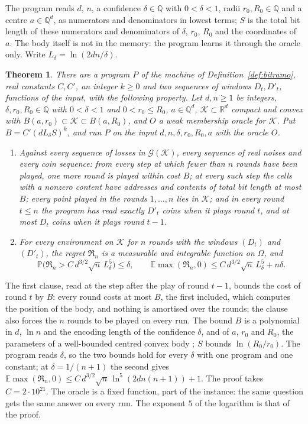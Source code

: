 \documentclass[11pt]{amsart}
\newtheorem{theorem}{Theorem}[section]
\theoremstyle{definition}
\numberwithin{equation}{section}
\newcommand{\R}{\mathbb{R}}
\newcommand{\E}{\mathbb{E}}
\newcommand{\Prob}{\mathbb{P}}
\newcommand{\cK}{\mathcal{K}}
\newcommand{\cG}{\mathscr{G}}
\newcommand{\Reg}{\mathfrak{R}}
\begin{document}
The program reads $d$, $n$, a confidence $\delta\in\mathbb Q$ with $0<\delta<1$, radii $r_0,R_0\in\mathbb Q$ and a centre $a\in\mathbb Q^d$, as numerators and denominators in lowest terms; $S$ is the total bit length of these numerators and denominators of $\delta$, $r_0$, $R_0$ and the coordinates of $a$. The body itself is not in the memory: the program learns it through the oracle only. Write $L_\delta=\ln(2dn/\delta)$.

\begin{theorem}\label{thm:unified}
There are a program $P$ of the machine of Definition~\ref{def:bitramo}, real constants $C,C'$, an integer $k\ge0$ and two sequences of windows $D_t,D'_t$, functions of the input, with the following property. Let $d,n\ge1$ be integers, $\delta,r_0,R_0\in\mathbb Q$ with $0<\delta<1$ and $0<r_0\le R_0$, $a\in\mathbb Q^d$, $\cK\subset\R^d$ compact and convex with $B(a,r_0)\subset\cK\subset B(a,R_0)$, and $O$ a weak membership oracle for $\cK$. Put $B=C'(dL_\delta S)^k$, and run $P$ on the input $d,n,\delta,r_0,R_0,a$ with the oracle $O$.
\begin{enumerate}[label=(\roman*)]
\item Against every sequence of losses in $\cG(\cK)$, every sequence of real noises and every coin sequence: from every step at which fewer than $n$ rounds have been played, one more round is played within cost $B$; at every such step the cells with a nonzero content have addresses and contents of total bit length at most $B$; every point played in the rounds $1,\dots,n$ lies in $\cK$; and in every round $t\le n$ the program has read exactly $D'_t$ coins when it plays round $t$, and at most $D_t$ coins when it plays round $t-1$.
\item For every environment on $\cK$ for $n$ rounds with the windows $(D_t)$ and $(D'_t)$, the regret $\Reg_n$ is a measurable and integrable function on $\Omega$, and
\[
\Prob\bigl(\Reg_n>C\,d^{3/2}\sqrt n\,L_\delta^5\bigr)\le\delta,\qquad\E\max(\Reg_n,0)\le C\,d^{3/2}\sqrt n\,L_\delta^5+n\delta .
\]
\end{enumerate}
\end{theorem}

The first clause, read at the step after the play of round $t-1$, bounds the cost of round $t$ by $B$: every round costs at most $B$, the first included, which computes the position of the body, and nothing is amortised over the rounds; the clause also forces the $n$ rounds to be played on every run. The bound $B$ is a polynomial in $d$, $\ln n$ and the encoding length of the confidence $\delta$, and of $a$, $r_0$ and $R_0$, the parameters of a well-bounded centred convex body \cite[(2.1.16) and (2.1.20)(c)]{GLS93}; $S$ bounds $\ln(R_0/r_0)$. The program reads $\delta$, so the two bounds hold for every $\delta$ with one program and one constant; at $\delta=1/(n+1)$ the second gives $\E\max(\Reg_n,0)\le C\,d^{3/2}\sqrt n\,\ln^5(2dn(n+1))+1$. The proof takes $C=2\cdot10^{21}$. The oracle is a fixed function, part of the instance: the same question gets the same answer on every run. The exponent $5$ of the logarithm is that of the proof.
\end{document}
